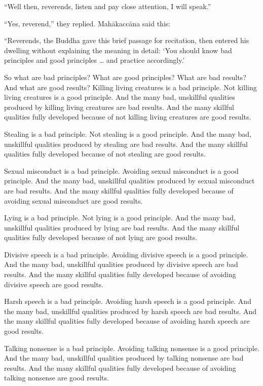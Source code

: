\documentclass[12pt,openany]{book}%
\begin{document}
“Well then, reverends, listen and pay close attention, I will speak.” 

“Yes, reverend,” they replied. \textsanskrit{Mahākaccāna} said this: 

“Reverends, the Buddha gave this brief passage for recitation, then entered his dwelling without explaining the meaning in detail: ‘You should know bad principles and good principles … and practice accordingly.’ 

So what are bad principles? What are good principles? What are bad results? And what are good results? Killing living creatures is a bad principle. Not killing living creatures is a good principle. And the many bad, unskillful qualities produced by killing living creatures are bad results. And the many skillful qualities fully developed because of not killing living creatures are good results. 

Stealing is a bad principle. Not stealing is a good principle. And the many bad, unskillful qualities produced by stealing are bad results. And the many skillful qualities fully developed because of not stealing are good results. 

Sexual misconduct is a bad principle. Avoiding sexual misconduct is a good principle. And the many bad, unskillful qualities produced by sexual misconduct are bad results. And the many skillful qualities fully developed because of avoiding sexual misconduct are good results. 

Lying is a bad principle. Not lying is a good principle. And the many bad, unskillful qualities produced by lying are bad results. And the many skillful qualities fully developed because of not lying are good results. 

Divisive speech is a bad principle. Avoiding divisive speech is a good principle. And the many bad, unskillful qualities produced by divisive speech are bad results. And the many skillful qualities fully developed because of avoiding divisive speech are good results. 

Harsh speech is a bad principle. Avoiding harsh speech is a good principle. And the many bad, unskillful qualities produced by harsh speech are bad results. And the many skillful qualities fully developed because of avoiding harsh speech are good results. 

Talking nonsense is a bad principle. Avoiding talking nonsense is a good principle. And the many bad, unskillful qualities produced by talking nonsense are bad results. And the many skillful qualities fully developed because of avoiding talking nonsense are good results. 
\end{document}
